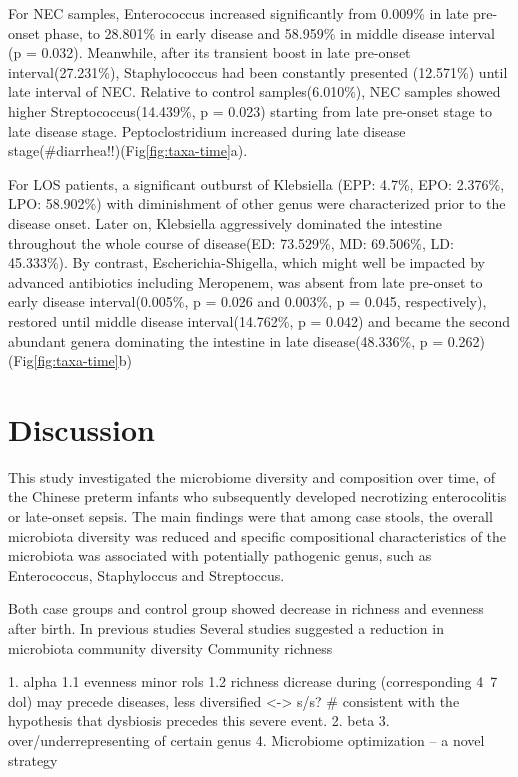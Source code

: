 \documentclass[fleqn,10pt, lineno]{wlpeerj} %
\begin{document}
  \noindent
  For NEC samples, Enterococcus increased significantly from 0.009\% in late pre-onset phase, to 28.801\% in early disease and 58.959\% in middle disease interval (p = 0.032). Meanwhile, after its transient boost in late pre-onset interval(27.231\%), Staphylococcus had been constantly presented (12.571\%) until late interval of NEC. Relative to control samples(6.010\%), NEC samples showed higher Streptococcus(14.439\%, p = 0.023) starting from late pre-onset stage to late disease stage. Peptoclostridium increased during late disease stage(\#diarrhea!!)(Fig\ref{fig:taxa-time}a).

  \noindent
  For LOS patients, a significant outburst of Klebsiella (EPP: 4.7\%, EPO: 2.376\%, LPO: 58.902\%) with diminishment of other genus were characterized prior to the disease onset. Later on, Klebsiella aggressively dominated the intestine throughout the whole course of disease(ED: 73.529\%, MD: 69.506\%, LD: 45.333\%). By contrast, Escherichia-Shigella, which might well be impacted by advanced antibiotics including Meropenem, was absent from late pre-onset to early disease interval(0.005\%, p = 0.026 and 0.003\%, p = 0.045, respectively), restored until middle disease interval(14.762\%, p = 0.042) and became the second abundant genera dominating the intestine in late disease(48.336\%, p = 0.262)(Fig\ref{fig:taxa-time}b)




\section*{Discussion}
This study investigated the microbiome diversity and composition over time, of the Chinese preterm infants who subsequently developed necrotizing enterocolitis or late-onset sepsis. The main findings were that among case stools, the overall microbiota diversity was reduced and specific compositional characteristics of the microbiota was associated with potentially pathogenic genus, such as Enterococcus, Staphyloccus and Streptoccus.

\noindent
Both case groups and control group showed decrease in richness and evenness after birth. In previous studies Several studies suggested a reduction in microbiota community diversity Community richness

1. alpha  1.1 evenness minor rols 1.2 richness dicrease during  (corresponding 4~7 dol) may precede diseases, less diversified <-> s/s? \# consistent with the hypothesis that dysbiosis precedes this severe event.
2. beta
3. over/underrepresenting of certain genus
4. Microbiome optimization -- a novel strategy
\end{document}
